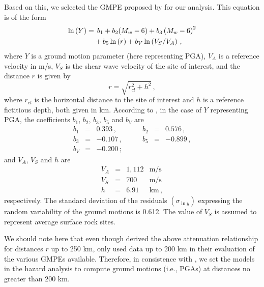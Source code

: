 Based on this, we selected the GMPE proposed by \citet{Kalkan2004} for our analysis. This equation is of the form
% 
\begin{align}
	\ln \left( Y \right) =
		& \hspace{1ex} b_1 + b_2(M_w - 6) + b_3 \left( M_w - 6 \right)^{2} \nonumber \\ 
		& + b_5 \ln \left( r \right) + b_V \ln \left( V_S / V_A \right)
	\, ,
\end{align}
% 
where $Y$ is a ground motion parameter (here representing PGA), $V_A$ is a reference velocity in m/s, $V_S$ is the shear wave velocity of the site of interest, and the distance $r$ is given by
% 
\begin{equation}
	r= \sqrt{ r^2_{\mathit{cl}} + h^2 }
	\, ,
\end{equation}
% 
where $r_{\mathit{cl}}$ is the horizontal distance to the site of interest and $h$ is a reference fictitious depth, both given in km. According to \citet{Kalkan2004}, in the case of $Y$ representing PGA, the coefficients $b_1$, $b_2$, $b_3$, $b_5$ and $b_V$ are
% 
\begin{equation}
\begin{array}{lcrlcr} 
	b_1 &=&  0.393   \,,&\hspace{2em}   b_2 &=& 0.576\,,   \\
	b_3 &=& -0.107   \,,&\hspace{2em}   b_5 &=& -0.899\,,  \\
	b_V &=& -0.200   \,; 
	\nonumber
\end{array}
\end{equation}
% 
and $V_A$, $V_S$ and $h$ are
% 
\begin{equation}
\begin{array}{lcrl} 
	V_A &=& 1,112 & \mathrm{m/s}	\\
	V_S &=&   700 & \mathrm{m/s}	\\
	h   &=&  6.91 & \mathrm{km}\,,
	\nonumber
\end{array}
\end{equation}
% 
respectively. The standard deviation of the residuals $(\sigma_{\ln y})$ expressing the random variability of the ground motions is 0.612. The value of $V_S$ is assumed to represent average surface rock sites.

We should note here that even though \citet{Kalkan2004} derived the above attenuation relationship for distances $r$ up to 250 km, \citet{Zafarani2014} only used data up to 200 km in their evaluation of the various GMPEs available. Therefore, in consistence with \citet{Zafarani2014}, we set the models in the hazard analysis to compute ground motions (i.e., PGAs) at distances no greater than 200 km.

